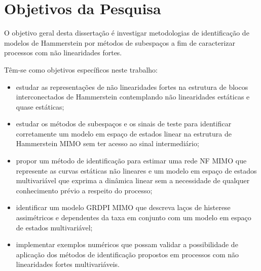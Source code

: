 \section{Objetivos da Pesquisa} 
\label{sec:intro_objetivo}


O objetivo geral desta dissertação é investigar metodologias de identificação de modelos de Hammerstein por métodos de subespaços a fim de caracterizar processos com não linearidades fortes. 

Têm-se como objetivos específicos neste trabalho:
\begin{itemize}
	\item estudar as representações de não linearidades fortes na estrutura de blocos interconectados de Hammerstein contemplando não linearidades estáticas e quase estáticas;
	
	\item estudar os métodos de subespaços e os sinais de teste para identificar corretamente um modelo em espaço de estados linear na estrutura de Hammerstein \acs{MIMO} sem ter acesso ao sinal intermediário;
	
	\item propor um método de identificação para estimar uma rede \acs{NF} \acs{MIMO} que represente as curvas estáticas não lineares e um modelo em espaço de estados multivariável que exprima a dinâmica linear sem a necessidade de qualquer conhecimento prévio a respeito do processo;
	
	\item identificar um modelo \acs{GRDPI} \acs{MIMO} que descreva laços de histerese assimétricos e dependentes da taxa em conjunto com um modelo em espaço de estados multivariável;
	
	\item implementar exemplos numéricos que possam validar a possibilidade de aplicação dos métodos de identificação propostos em processos com não linearidades fortes multivariáveis.
\end{itemize}


